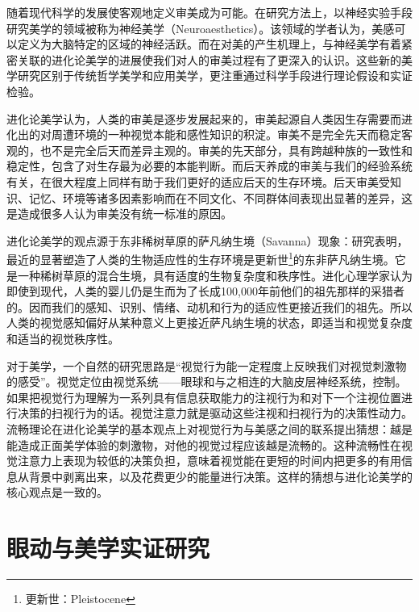 随着现代科学的发展使客观地定义审美成为可能。在研究方法上，以神经实验手段研究美学的领域被称为神经美学（Neuroaesthetics）。该领域的学者认为，美感可以定义为大脑特定的区域的神经活跃。而在对美的产生机理上，与神经美学有着紧密关联的进化论美学的进展使我们对人的审美过程有了更深入的认识。这些新的美学研究区别于传统哲学美学和应用美学，更注重通过科学手段进行理论假设和实证检验。

进化论美学认为，人类的审美是逐步发展起来的，审美起源自人类因生存需要而进化出的对周遭环境的一种视觉本能和感性知识的积淀。审美不是完全先天而稳定客观的，也不是完全后天而差异主观的。审美的先天部分，具有跨越种族的一致性和稳定性，包含了对生存最为必要的本能判断。而后天养成的审美与我们的经验系统有关，在很大程度上同样有助于我们更好的适应后天的生存环境。后天审美受知识、记忆、环境等诸多因素影响而在不同文化、不同群体间表现出显著的差异，这是造成很多人认为审美没有统一标准的原因。

进化论美学的观点源于东非稀树草原的萨凡纳生境（Savanna）现象：研究表明，最近的显著塑造了人类的生物适应性的生存环境是更新世\footnote{更新世：Pleistocene}的东非萨凡纳生境。它是一种稀树草原的混合生境，具有适度的生物复杂度和秩序性。进化心理学家认为即使到现代，人类的婴儿仍是生而为了长成100,000年前他们的祖先那样的采猎者的。因而我们的感知、识别、情绪、动机和行为的适应性更接近我们的祖先。所以人类的视觉感知偏好从某种意义上更接近萨凡纳生境的状态，即适当和视觉复杂度和适当的视觉秩序性。

对于美学，一个自然的研究思路是“视觉行为能一定程度上反映我们对视觉刺激物的感受”。视觉定位由视觉系统——眼球和与之相连的大脑皮层神经系统，控制。如果把视觉行为理解为一系列具有信息获取能力的注视行为和对下一个注视位置进行决策的扫视行为的话。视觉注意力就是驱动这些注视和扫视行为的决策性动力。流畅理论在进化论美学的基本观点上对视觉行为与美感之间的联系提出猜想：越是能造成正面美学体验的刺激物，对他的视觉过程应该越是流畅的。这种流畅性在视觉注意力上表现为较低的决策负担，意味着视觉能在更短的时间内把更多的有用信息从背景中剥离出来，以及花费更少的能量进行决策。这样的猜想与进化论美学的核心观点是一致的。

\section{眼动与美学实证研究}

